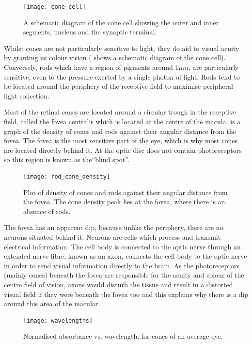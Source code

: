 \begin{figure}[H]
\centering
  \texttt{[image: cone\_cell]}
\caption{A schematic diagram of the cone cell showing the outer and inner
segments, nucleus and the synaptic terminal.\cite{wikicone}}
\label{fig:cone}
\end{figure}

Whilst cones are not particularly sensitive to light, they do aid to visual
acuity by granting us colour vision ( shows a schematic
diagram of the cone cell).\cite{bowmaker1980visual} Conversely, rods
which have a region of pigments around $1\mu{m}$, are particularly
sensitive, even to the pressure exerted by a single photon of light.
Rods tend to be located around the periphery of the receptive field to
maximise peripheral light collection.
\cite{liebman1964sensitive,baylor1979responses}

Most of the retinal cones are located around a circular trough in the
receptive field, called the fovea centralis which is located at the centre
of the macula.\cite{hendrickson1994primate}
 is a graph of the density of cones and rods
against their angular distance from the fovea. The fovea is the most
sensitive part of the eye, which is why most cones are located directly
behind it. At the optic disc does not contain photoreceptors so this
region is known as the\enquote{blind spot}.

\begin{figure}[H]
\centering
  \texttt{[image: rod\_cone\_density]}
\caption{Plot of density of cones and rods against their angular distance from
the fovea. The cone density peak lies at the fovea, where there is an absence
of rods.\cite{rod_cone_density}}
\label{fig:rod_cone_density}
\end{figure}

The fovea has an apparent dip, because unlike the periphery, there are
no neurons situated behind it. Neurons are cells which process and
transmit electrical information. The cell body is connected to the optic
nerve through an extended nerve fibre, known as an axon, connects
the cell body to the optic nerve in order to send visual information
directly to the brain. As the photoreceptors (mainly cones) beneath the
fovea are responsible for the acuity and colour of the centre field of vision,
axons would disturb the tissue and result in a distorted visual field if they
were beneath the fovea too and this explains why there is a dip around
 this area of the macular.
 
 \begin{figure}[H]
\centering
  \texttt{[image: wavelengths]}
\caption{Normalised absorbance vs. wavelength, for cones of an average eye.\cite{wikicones}}
\label{fig:wavelengths}
\end{figure}


